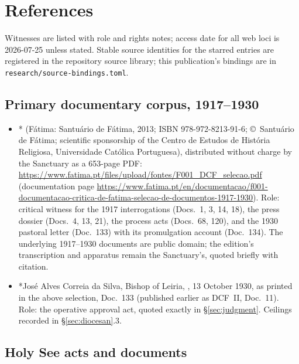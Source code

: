 \sectionguard
\section{References}

Witnesses are listed with role and rights notes; access date for all
web loci is 2026-07-25 unless stated. Stable source identities for
the starred entries are registered in the repository source library;
this publication's bindings are in
\texttt{research/source-bindings.toml}.

\subsection*{Primary documentary corpus, 1917--1930}

\begin{itemize}
\item * (F\'atima: Santu\'ario de F\'atima, 2013;
ISBN 978-972-8213-91-6; \copyright~Santu\'ario de F\'atima; scientific
sponsorship of the Centro de Estudos de Hist\'oria Religiosa,
Universidade Cat\'olica Portuguesa), distributed without charge by
the Sanctuary as a 653-page PDF:
\url{https://www.fatima.pt/files/upload/fontes/F001_DCF_selecao.pdf}
(documentation page
\url{https://www.fatima.pt/en/documentacao/f001-documentacao-critica-de-fatima-selecao-de-documentos-1917-1930}).
Role: critical witness for the 1917 interrogations (Docs.~1, 3, 14,
18), the press dossier (Docs.~4, 13, 21), the process acts (Docs.~68,
120), and the 1930 pastoral letter (Doc.~133) with its promulgation
account (Doc.~134). The underlying 1917--1930 documents are public
domain; the edition's transcription and apparatus remain the
Sanctuary's, quoted briefly with citation.
\item *Jos\'e Alves Correia da Silva, Bishop of Leiria, , 13 October
1930, as printed in the above selection, Doc.~133 (published earlier
as DCF~II, Doc.~11). Role: the operative approval act, quoted exactly
in \S\ref{sec:judgment}. Ceilings recorded in \S\ref{sec:diocesan}.3.
\end{itemize}

\subsection*{Holy See acts and documents}

